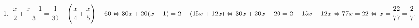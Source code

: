 1. $\cfrac{x}{2}+\cfrac{x-1}{3}=\cfrac{1}{30}-\left(\cfrac{x}{4}+\cfrac{x}{5}\right)\Big|\cdot60\Leftrightarrow30x+20(x-1)=2-(15x+12x)\Leftrightarrow30x+20x-20=2-15x-12x
\Leftrightarrow77x=22\Leftrightarrow x=\cfrac{22}{77}=\cfrac{2}{7}.$\\
